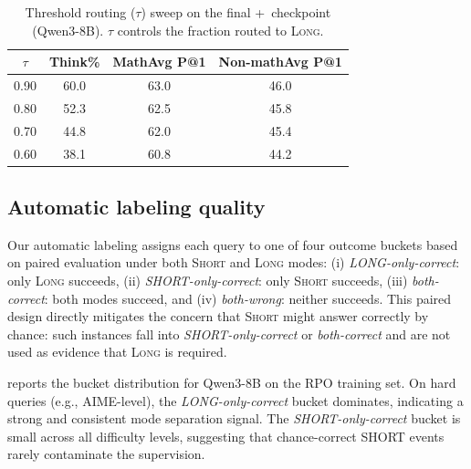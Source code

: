 \begin{table}[t]
\centering
\small
\caption{Threshold routing ($\tau$) sweep on the final +\Ours~checkpoint (Qwen3-8B). $\tau$ controls the fraction routed to \textsc{Long}.}
\label{tab:post_rpo_threshold}
\addtolength{\tabcolsep}{-2.5pt}
\begin{tabular}{c|ccc}
\toprule
$\tau$ & \textbf{Think\%} & \textbf{MathAvg P@1} & \textbf{Non-mathAvg P@1} \\
\midrule
0.90 & 60.0 & 63.0 & 46.0 \\
0.80 & 52.3 & 62.5 & 45.8 \\
0.70 & 44.8 & 62.0 & 45.4 \\
0.60 & 38.1 & 60.8 & 44.2 \\
\bottomrule
\end{tabular}
\end{table}

\subsection{Automatic labeling quality}
\label{sec:labeling_quality}

Our automatic labeling assigns each query to one of four outcome buckets based on paired evaluation under both \textsc{Short} and \textsc{Long} modes: (i) \textit{LONG-only-correct}: only \textsc{Long} succeeds, (ii) \textit{SHORT-only-correct}: only \textsc{Short} succeeds, (iii) \textit{both-correct}: both modes succeed, and (iv) \textit{both-wrong}: neither succeeds. This paired design directly mitigates the concern that \textsc{Short} might answer correctly by chance: such instances fall into \textit{SHORT-only-correct} or \textit{both-correct} and are not used as evidence that \textsc{Long} is required.

 reports the bucket distribution for Qwen3-8B on the RPO training set. On hard queries (e.g., AIME-level), the \textit{LONG-only-correct} bucket dominates, indicating a strong and consistent mode separation signal. The \textit{SHORT-only-correct} bucket is small across all difficulty levels, suggesting that chance-correct SHORT events rarely contaminate the supervision.

\begin{table}[t]
\centering
\small
\caption{Outcome bucket distribution on the \Ours~training set (Qwen3-8B). 
}
\label{tab:labeling_audit}
\end{table}

